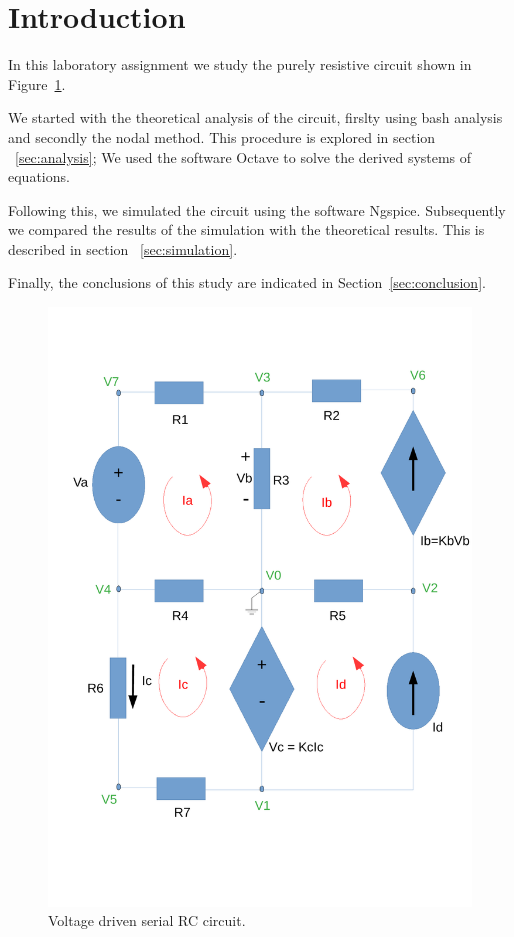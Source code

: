 \section{Introduction}
\label{sec:introduction}

In this laboratory assignment we study the purely resistive circuit 
shown in Figure~\ref{fig:rc}.



We started with the theoretical analysis of the circuit, 
firslty using bash analysis and secondly the nodal method. 
This procedure is explored in section ~\ref{sec:analysis};
We used the software Octave to solve the derived systems of equations.

Following this, we simulated the circuit using the software Ngspice. 
Subsequently we compared the results of the simulation with the theoretical
results. This is described in section ~\ref{sec:simulation}.

Finally, the conclusions of this study are indicated in
Section~\ref{sec:conclusion}.

\begin{figure}[ht] \centering
    \includegraphics[width=0.4\linewidth]{circuito_tcfe.pdf}
    \caption{Voltage driven serial RC circuit.}
    \label{fig:rc}
\end{figure}

